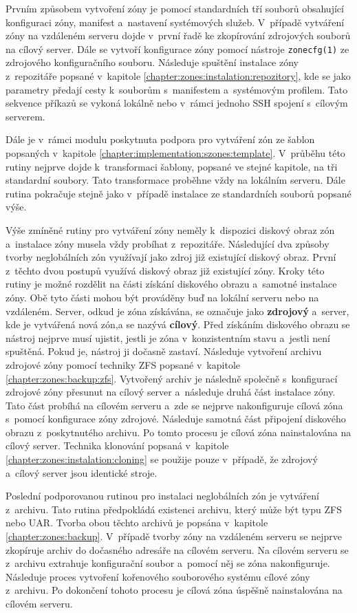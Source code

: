 Prvním způsobem vytvoření zóny je pomocí standardních tří souborů obsahující konfiguraci zóny, manifest a~nastavení systémových
služeb. V~případě vytváření zóny na vzdáleném serveru dojde v~první řadě ke zkopírování zdrojových souborů na cílový server.
Dále se vytvoří konfigurace zóny pomocí nástroje \verb|zonecfg(1)| ze zdrojového konfiguračního souboru. Následuje spuštění
instalace zóny z~repozitáře popsané v~kapitole \ref{chapter:zones:instalation:repozitory}, kde se jako parametry předají
cesty k~souborům s~manifestem a~systémovým profilem. Tato sekvence příkazů se vykoná lokálně nebo v~rámci jednoho SSH spojení
s~cílovým serverem.

Dále je v~rámci modulu poskytnuta podpora pro vytváření zón ze šablon popsaných v~kapitole \ref{chapter:implementation:szones:template}. 
V~průběhu této rutiny nejprve dojde k~transformaci šablony, popsané ve stejné kapitole, na tři standardní soubory. Tato transformace
proběhne vždy na lokálním serveru. Dále rutina pokračuje stejně jako v~případě instalace ze standardních souborů popsané výše.

Výše zmíněné rutiny pro vytváření zóny neměly k~dispozici diskový obraz zón a~instalace zóny musela vždy probíhat z~repozitáře.
Následující dva způsoby tvorby neglobálních zón využívají jako zdroj již existující diskový obraz. První z~těchto dvou postupů
využívá diskový obraz již existující zóny. Kroky této rutiny je možné rozdělit na části získání diskového obrazu a~samotné instalace
zóny. Obě tyto části mohou být prováděny buď na lokální serveru nebo na vzdáleném. Server, odkud je zóna získávána, se označuje
jako \textbf{zdrojový} a~server, kde je vytvářená nová zón,a se nazývá \textbf{cílový}. Před získáním diskového obrazu se 
nástroj nejprve musí ujistit, jestli je zóna v~konzistentním stavu a~jestli není spuštěná. Pokud je, nástroj ji dočasně zastaví.
Následuje vytvoření archivu zdrojové zóny pomocí techniky ZFS popsané v~kapitole \ref{chapter:zones:backup:zfs}. Vytvořený archiv je
následně společně s~konfigurací zdrojové zóny přesunut na cílový server a~následuje druhá část instalace zóny. Tato část probíhá na
cílovém serveru a~zde se nejprve nakonfiguruje cílová zóna s~pomocí konfigurace zóny zdrojové. Následuje samotná část připojení
diskového obrazu z~poskytnutého archivu. Po tomto procesu je cílová zóna nainstalována na cílový server. Technika klonování
popsaná v~kapitole \ref{chapter:zones:instalation:cloning} se použije pouze v~případě, že zdrojový a~cílový server jsou 
identické stroje.

Poslední podporovanou rutinou pro instalaci neglobálních zón je vytváření z~archivu. Tato rutina předpokládá existenci archivu,
který může být typu ZFS nebo UAR. Tvorba obou těchto archivů je popsána v~kapitole \ref{chapter:zones:backup}. V~případě tvorby
zóny na vzdáleném serveru se nejprve zkopíruje archiv do dočasného adresáře na cílovém serveru. Na cílovém serveru se z~archivu
extrahuje konfigurační soubor a~pomocí něj se zóna nakonfiguruje. Následuje proces vytvoření kořenového souborového systému cílové
zóny z~archivu. Po dokončení tohoto procesu je cílová zóna úspěšně nainstalována na cílovém serveru.


